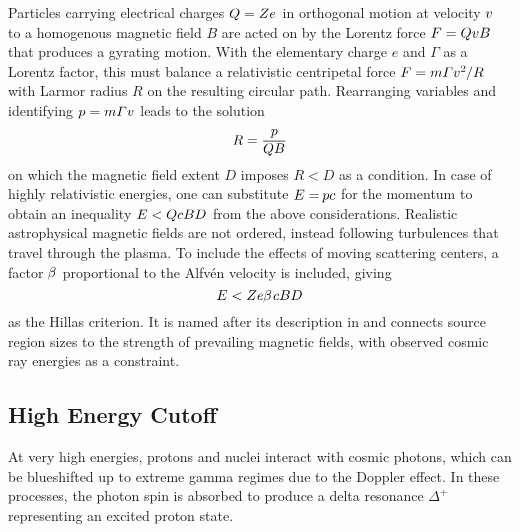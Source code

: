 \begin{spacing}{0.985}
	Particles carrying electrical charges $Q = Ze \kern+0.5pt$ in orthogonal motion at velocity $v \kern+1.0pt$ to a homogenous magnetic
	field $B$ are acted on by the Lorentz force $F = QvB \kern+0.5pt$ that produces a gyrating motion. With the elementary charge $e$ and
	$\varGamma$ as a Lorentz factor, this must balance a relativistic centripetal force $F = m \varGamma v^2 \kern-0.5pt / R$ with Larmor
	radius $R$ on the resulting circular path. Rearranging variables and identifying $p = m \varGamma v \kern+0.5pt$ leads to the solution
	\begin{equation}
		R = \frac{p}{\raisebox{0.3ex}{$QB \kern+0.3pt$}}
	\end{equation}
	on which the magnetic field extent $D$ imposes $R < D$ as a condition. In case of highly relativistic energies, one can substitute
	$E = \kern-0.8pt pc$ for the momentum to obtain an inequality $E < QcBD \kern+0.5pt$ from the above considerations. Realistic astrophysical
	magnetic fields are not ordered, instead following turbulences that travel through the plasma. To include the effects of moving scattering
	centers, a factor $\kern-0.5pt \beta \kern+0.5pt$ proportional to the Alfvén velocity is included, giving
	\begin{equation}
		E < Ze \kern-0.3pt \beta \kern+0.9pt cBD
		\label{eqn:hillas}
	\end{equation}
	as the Hillas criterion. It is named after its description in \cite{Hillas_1984} and connects source region sizes to the strength of
	prevailing magnetic fields, with observed cosmic ray energies as a constraint.
	
	
	
	\subsection{High Energy Cutoff}
	\label{sub:cutoff}
	
	At very high energies, protons and nuclei interact with cosmic photons, which can be blueshifted up to extreme gamma regimes due to
	the Doppler effect. In these processes, the photon spin is absorbed to produce a delta resonance $\Delta^+$ representing an excited
	proton state.
	\enlargethispage*{\baselineskip}\newpage
\end{spacing}

